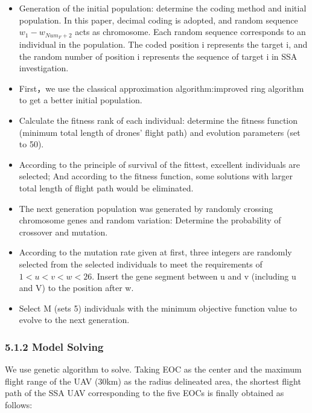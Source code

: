 \documentclass{mcmthesis}
\begin{document}
\begin{itemize}
  \item Generation of the initial population: determine the coding method and initial population.
  In this paper, decimal coding is adopted, and random sequence $w_1-w_{Num_F+2}$ acts as chromosome. Each random sequence corresponds to an individual in the population.
  The coded position i represents the target i, and the random number of position i represents the sequence of target i in SSA investigation.

  \item First，we use the classical approximation algorithm:improved ring algorithm to get a better initial population.
  \item Calculate the fitness rank of each individual: determine the fitness function (minimum total length of drones' flight path) and evolution parameters (set to 50).

  \item According to the principle of survival of the fittest, excellent individuals are selected; And according to the fitness function, some solutions with larger total length of flight path would be eliminated.
  \item The next generation population was generated by randomly crossing chromosome genes and random variation: Determine the probability of crossover and mutation.
  \item According to the mutation rate given at first, three integers are randomly selected from the selected individuals to meet the requirements of $1 < u  < v < w < 26$.
  Insert the gene segment between u and v (including u and V) to the position after w.
  \item Select M (sets 5) individuals with the minimum objective function value to evolve to the next generation.

\end{itemize}



\subsubsection*{5.1.2 Model Solving}

We use genetic algorithm to solve. Taking EOC as the center and the maximum flight range of the UAV (30km) as the radius delineated area, the shortest flight path of the SSA UAV corresponding to the five EOCs is finally obtained as follows:
\end{document}
